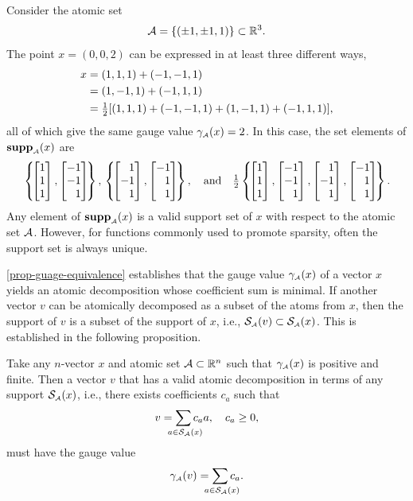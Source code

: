   \begin{example}
    Consider the atomic set
    \[
      \mathcal{A}=\{(\pm1,\pm1,1)\}\subset\mathbb{R}^3.
    \]
    The point $x=(0,0,2)$ can be expressed in at least three different ways,
    \begin{align*}
      x &= (1,1,1) + (-1,-1,1)
      \\&= (1,-1,1) + (-1,1,1)
      \\&= {\textstyle{\frac{1}{2}}}[(1,1,1) + (-1,-1,1) + (1,-1,1) + (-1,1,1)],
    \end{align*}
    all of which give the same gauge value $\gamma_{\scriptscriptstyle\mathcal{A}} (x)=2$. In this case, the set
    elements of $\operatorname{\hbox{\rm\textbf{supp}}}_{\scriptscriptstyle\mathcal{A}}(x)$ are 
    \begin{align*}
        \left\{\! 
          \bmatr{ 1 \\ 1 \\ 1}, 
          \bmatr{-1 \\ -1 \\ 1}
        \!\right\},
        \,
      \left\{\! 
        \bmatr{1 \\ -1 \\ 1},
        \bmatr{-1 \\ 1 \\ 1}
      \!\right \},
      \text{and} 
      \half\left\{\! 
        \bmatr{ 1 \\  1 \\ 1},
        \bmatr{-1 \\ -1 \\ 1},
        \bmatr{ 1 \\ -1 \\ 1},
        \bmatr{-1 \\  1 \\ 1}
      \!\right \}.
  \end{align*}
  Any element of $\operatorname{\hbox{\rm\textbf{supp}}}_{\scriptscriptstyle\mathcal{A}}(x)$ is a valid support set of $x$ with
  respect to the atomic set $\mathcal{A}$.  However, for functions commonly
  used to promote sparsity, often the support set is always unique.
  \end{example}

  \autoref{prop-guage-equivalence} establishes that the gauge value
$\gamma_{\scriptscriptstyle\mathcal{A}}(x)$ of a vector $x$ yields an atomic decomposition whose
coefficient sum is minimal. If another vector $v$ can be atomically
decomposed as a subset of the atoms from $x$, then the support of $v$
is a subset of the support of $x$, i.e.,
$\operatorname{\mathcal{S}_{\scriptscriptstyle\mathcal{A}}}(v)\subset\operatorname{\mathcal{S}_{\scriptscriptstyle\mathcal{A}}}(x)$. This is established in the following
proposition.

\begin{proposition} \label{prop:same-support-sets} 
  Take any
  $n$-vector $x$ and atomic set $\mathcal{A}\subset\mathbb{R}^n$ such that
  $\gamma_{\scriptscriptstyle\mathcal{A}}(x)$ is positive and finite. Then
  a vector $v$ that has a valid atomic decomposition in terms of any support
  $\mathcal{S}_{\scriptscriptstyle\mathcal{A}}(x)$, i.e., there exists coefficients $c_a$ such that
  \begin{equation}\label{eq:28} 
    v = \sum_{\ \mathclap{a\in \suppa(x)}}c_a a, \quad c_a \geq 0,
  \end{equation}
  must have the gauge value 
  \[\gauge\As(v) = \sum_{\ \mathclap{a\in \suppa(x)}}c_a.\]
\end{proposition}

